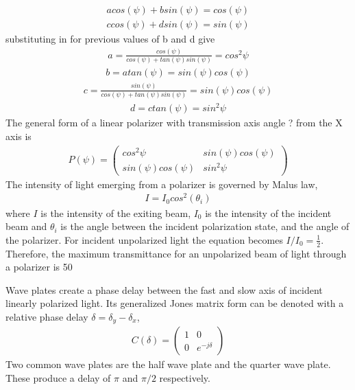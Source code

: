 \begin{align}
    acos(\psi) + bsin(\psi) = cos(\psi) \\
    ccos(\psi) + dsin(\psi) = sin(\psi)
\end{align}
%
substituting in for previous values of b and d give
%
\begin{align}
    a = \frac{cos(\psi)}{cos(\psi) + tan(\psi)sin(\psi)} = cos^2\psi
\end{align}
\begin{align}
    b = atan(\psi) = sin(\psi)cos(\psi)
\end{align}
\begin{align}
    c = \frac{sin(\psi)}{cos(\psi) + tan(\psi)sin(\psi)} = sin(\psi)cos(\psi)
\end{align}
\begin{align}
    d = ctan(\psi) = sin^2\psi
\end{align}
%
The general form of a linear polarizer with transmission axis angle ? from the X axis is
%
\begin{align}
    P(\psi) =
    \begin{pmatrix}
        cos^2\psi & sin(\psi)cos(\psi) \\
        sin(\psi)cos(\psi) & sin^2\psi
    \end{pmatrix}
\end{align}
%
The intensity of light emerging from a polarizer is governed by Malus law,
%
\begin{align}
    I = I_0cos^2(\theta_i)
\end{align}
%
where $I$ is the intensity of the exiting beam, $I_0$ is the intensity of the incident beam and $\theta_i$ is the angle between the incident polarization state, and the angle of the polarizer.   For incident unpolarized light the equation becomes $I / I_0 = \frac{1}{2}$.  Therefore, the maximum transmittance for an unpolarized beam of light through a polarizer is 50%

Wave plates create a phase delay between the fast and slow axis of incident linearly polarized light.  Its generalized Jones matrix form can be denoted with a relative phase delay $\delta=\delta_y-\delta_x$,
\begin{align}
    C(\delta) =
    \begin{pmatrix}
        1 & 0 \\
        0 & e^{-j\delta}
    \end{pmatrix}
\end{align}
%
Two common wave plates are the half wave plate and the quarter wave plate.  These produce a delay of $\pi$ and $\pi/2$ respectively.

